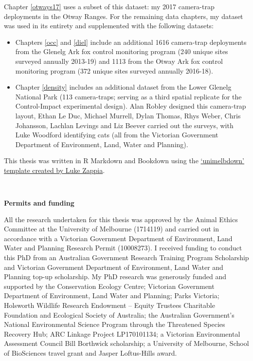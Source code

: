 \documentclass[11pt,a4paper,titlepage,twoside,openright]{style/unimelbthesis}
\begin{document}
\begin{frontmatter}
\begin{preface}
    Chapter \ref{otways17} uses a subset of this dataset: my 2017 camera-trap deployments in the Otway Ranges. For the remaining data chapters, my dataset was used in its entirety and supplemented with the following datasets:
    \begin{itemize}
    \item
      Chapters \ref{occ} and \ref{diel} include an additional 1616 camera-trap deployments from the Glenelg Ark fox control monitoring program (240 unique sites surveyed annually 2013-19) and 1113 from the Otway Ark fox control monitoring program (372 unique sites surveyed annually 2016-18).
    \item
      Chapter \ref{density} includes an additional dataset from the Lower Glenelg National Park (113 camera-traps; serving as a third spatial replicate for the Control-Impact experimental design). Alan Robley designed this camera-trap layout, Ethan Le Duc, Michael Murrell, Dylan Thomas, Rhys Weber, Chris Johansson, Lachlan Levings and Liz Beever carried out the surveys, with Luke Woodford identifying cats (all from the Victorian Government Department of Environment, Land, Water and Planning).
    \end{itemize}
    This thesis was written in R Markdown and Bookdown using the \href{https://github.com/lazappi/unimelbdown}{`unimelbdown' template created by Luke Zappia}.
    
    \(~\)
    
    \textbf{Permits and funding}
    
    All the research undertaken for this thesis was approved by the Animal Ethics Committee at the University of Melbourne (1714119) and carried out in accordance with a Victorian Government Department of Environment, Land Water and Planning Research Permit (10008273). I received funding to conduct this PhD from an Australian Government Research Training Program Scholarship and Victorian Government Department of Environment, Land Water and Planning top-up scholarship. My PhD research was generously funded and supported by the Conservation Ecology Centre; Victorian Government Department of Environment, Land Water and Planning; Parks Victoria; Holsworth Wildlife Research Endowment -- Equity Trustees Charitable Foundation and Ecological Society of Australia; the Australian Government's National Environmental Science Program through the Threatened Species Recovery Hub; ARC Linkage Project LP170101134; a Victorian Environmental Assessment Council Bill Borthwick scholarship; a University of Melbourne, School of BioSciences travel grant and Jasper Loftus-Hills award.
    

\end{preface}
\end{frontmatter}
\end{document}
